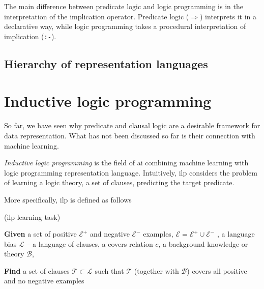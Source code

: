The main difference between predicate logic and logic programming is in the interpretation of the implication operator.
Predicate logic ($\Rightarrow$) interprets it in a declarative way, while logic programming takes a procedural interpretation of implication (\texttt{:-}). 










\subsection{Hierarchy of representation languages}





\section{Inductive logic programming}


So far, we have seen why predicate and clausal logic are a desirable framework for data representation.
What has not been discussed so far is their connection with machine learning.


\textit{Inductive logic programming} \cite{LucRLbook,Lavrac:1993:ILP:562956} is the field of \gls{ai} combining machine learning with logic programming representation language.
Intuitively, \gls{ilp} considers the problem of learning a logic theory, a set of clauses, predicting the target predicate.

More specifically, \gls{ilp} is defined as follows

\begin{definition}{(\gls{ilp} learning task)}
	
	
\textbf{Given}
 a set of positive $\mathcal{E}^+$ and negative $\mathcal{E}^-$ examples, $\mathcal{E} = \mathcal{E}^+ \cup \mathcal{E}^-$ ,
 a language bias $\mathcal{L}$ -- a language of clauses,
 a covers relation $c$,
 a background knowledge or theory $\mathcal{B}$,


\textbf{Find} a set of clauses $\mathcal{T} \subset \mathcal{L}$ such that $\mathcal{T}$ (together with $\mathcal{B}$) covers all positive and no negative examples

\end{definition}



